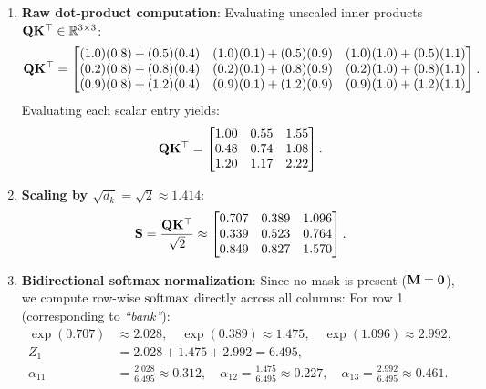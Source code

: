 \documentclass[../../main.tex]{subfiles}
\begin{document}
\begin{enumerate}
    \item \textbf{Raw dot-product computation}:
    Evaluating unscaled inner products $\mathbf{Q} \mathbf{K}^\top \in \mathbb{R}^{3 \times 3}$:
    \begin{equation}
    \mathbf{Q} \mathbf{K}^\top = \begin{bmatrix}
    (1.0)(0.8) + (0.5)(0.4) & (1.0)(0.1) + (0.5)(0.9) & (1.0)(1.0) + (0.5)(1.1) \\
    (0.2)(0.8) + (0.8)(0.4) & (0.2)(0.1) + (0.8)(0.9) & (0.2)(1.0) + (0.8)(1.1) \\
    (0.9)(0.8) + (1.2)(0.4) & (0.9)(0.1) + (1.2)(0.9) & (0.9)(1.0) + (1.2)(1.1)
    \end{bmatrix}.
    \end{equation}
    Evaluating each scalar entry yields:
    \begin{equation}
    \mathbf{Q} \mathbf{K}^\top = \begin{bmatrix}
    1.00 & 0.55 & 1.55 \\
    0.48 & 0.74 & 1.08 \\
    1.20 & 1.17 & 2.22
    \end{bmatrix}.
    \end{equation}
    \item \textbf{Scaling by $\sqrt{d_k} = \sqrt{2} \approx 1.414$}:
    \begin{equation}
    \label{eq:enc_scaled_scores}
    \mathbf{S} = \frac{\mathbf{Q} \mathbf{K}^\top}{\sqrt{2}} \approx \begin{bmatrix}
    0.707 & 0.389 & 1.096 \\
    0.339 & 0.523 & 0.764 \\
    0.849 & 0.827 & 1.570
    \end{bmatrix}.
    \end{equation}
    \item \textbf{Bidirectional softmax normalization}:
    Since no mask is present ($\mathbf{M} = \mathbf{0}$), we compute row-wise $\operatorname{\mathrm{softmax}}$ directly across all columns:
    For row 1 (corresponding to \emph{``bank''}):
    \begin{align}
    \exp(0.707) &\approx 2.028, \quad \exp(0.389) \approx 1.475, \quad \exp(1.096) \approx 2.992, \\
    Z_1 &= 2.028 + 1.475 + 2.992 = 6.495, \\
    \alpha_{11} &= \frac{2.028}{6.495} \approx 0.312, \quad
    \alpha_{12} = \frac{1.475}{6.495} \approx 0.227, \quad
    \alpha_{13} = \frac{2.992}{6.495} \approx 0.461.
    \end{align}

\end{enumerate}
\end{document}

